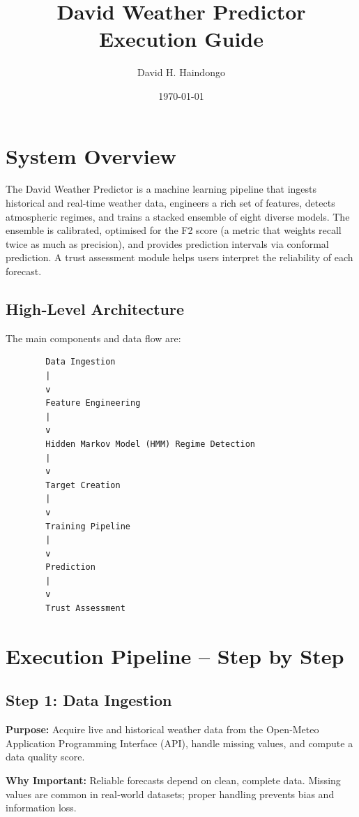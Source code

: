 \documentclass[12pt]{article}
\title{David Weather Predictor \\ Execution Guide}
\author{David H. Haindongo}
\date{\today}
\begin{document}
	\maketitle
	

	\newpage
	\tableofcontents
	
	\newpage
	
	\section{System Overview}
	The David Weather Predictor is a machine learning pipeline that ingests historical and real‑time weather data, engineers a rich set of features, detects atmospheric regimes, and trains a stacked ensemble of eight diverse models. The ensemble is calibrated, optimised for the F2 score (a metric that weights recall twice as much as precision), and provides prediction intervals via conformal prediction. A trust assessment module helps users interpret the reliability of each forecast.
	
	\subsection{High‑Level Architecture}
	The main components and data flow are:
	
	\begin{verbatim}
		Data Ingestion
		|
		v
		Feature Engineering
		|
		v
		Hidden Markov Model (HMM) Regime Detection
		|
		v
		Target Creation
		|
		v
		Training Pipeline
		|
		v
		Prediction
		|
		v
		Trust Assessment
	\end{verbatim}
	
	\section{Execution Pipeline – Step by Step}
	
	\subsection{Step 1: Data Ingestion}
	\textbf{Purpose:} Acquire live and historical weather data from the Open‑Meteo Application Programming Interface (API), handle missing values, and compute a data quality score.
	
	\textbf{Why Important:} Reliable forecasts depend on clean, complete data. Missing values are common in real‑world datasets; proper handling prevents bias and information loss.
	
\end{document}
